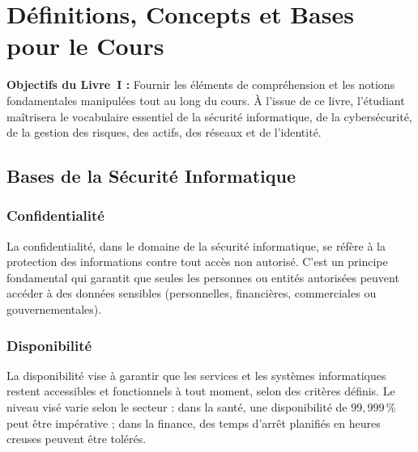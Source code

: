 
\chapter{Définitions, Concepts et Bases pour le Cours}
\label{chap:definitions}

\begin{boxobjectifs}
\textbf{Objectifs du Livre~I :} Fournir les éléments de compréhension et les notions fondamentales manipulées tout au long du cours. À l'issue de ce livre, l'étudiant maîtrisera le vocabulaire essentiel de la sécurité informatique, de la cybersécurité, de la gestion des risques, des actifs, des réseaux et de l'identité.
\end{boxobjectifs}

\section{Bases de la Sécurité Informatique}

\subsection{Confidentialité}
La confidentialité, dans le domaine de la sécurité informatique, se réfère à la protection des informations contre tout accès non autorisé. C'est un principe fondamental qui garantit que seules les personnes ou entités autorisées peuvent accéder à des données sensibles (personnelles, financières, commerciales ou gouvernementales).

\subsection{Disponibilité}
La disponibilité vise à garantir que les services et les systèmes informatiques restent accessibles et fonctionnels à tout moment, selon des critères définis. Le niveau visé varie selon le secteur : dans la santé, une disponibilité de $99{,}999\,\%$ peut être impérative ; dans la finance, des temps d'arrêt planifiés en heures creuses peuvent être tolérés.

